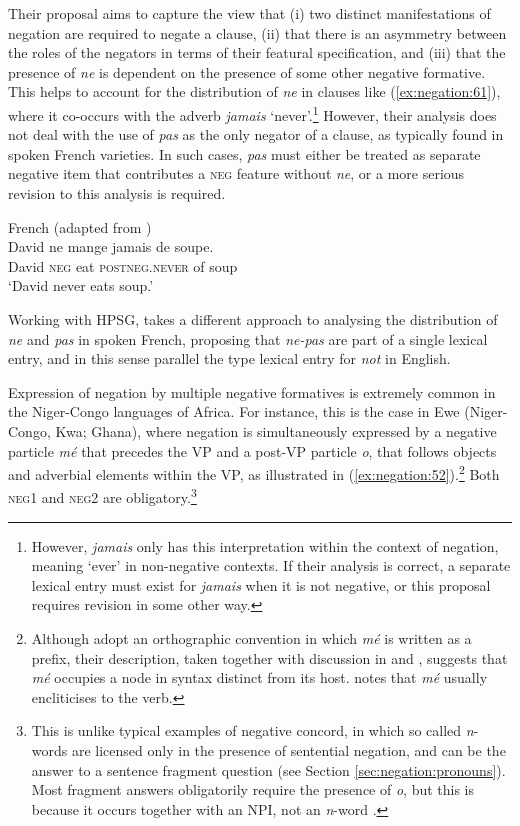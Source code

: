 \documentclass[output=paper,hidelinks]{langscibook}
\begin{document}
Their proposal aims to capture the view that (i) two distinct manifestations of negation are required to negate a clause, (ii) that there is an asymmetry between the roles of the negators in terms of their featural specification, and (iii) that the presence of \emph{ne} is dependent on the presence of some other negative formative. This helps to account for the distribution of \emph{ne} in clauses like (\ref{ex:negation:61}), where it co-occurs with the adverb \emph{jamais} ‘never’.\footnote{However, \emph{jamais} only has this interpretation within the context of negation, meaning `ever' in non-negative contexts. If their analysis is correct,  a separate lexical entry must exist for \emph{jamais} when it is not negative, or this proposal requires revision in some other way.} However, their analysis does not deal with the use of \emph{pas} as the only negator of a clause, as typically found in spoken French varieties. In such cases, \emph{pas} must either be treated as separate negative item that contributes a \textsc{neg} feature without \emph {ne}, or a more serious revision to this analysis is required.

\ea French (adapted from \citealt [143]{ButtEtAl1999})\\
\label{ex:negation:61} 
\gll David ne mange jamais de soupe.\\
David \textsc{neg} eat \textsc{postneg.never} of soup\\
\glt `David never eats soup.'
\z  

Working with HPSG, \citet{Kim:00,Kim:21} takes a different approach to analysing the distribution of \emph{ne} and \emph{pas} in spoken French, proposing that \emph{ne-pas} are part of a single lexical entry, and in this sense parallel the type lexical entry for \emph{not} in English.

Expression of negation by multiple negative formatives is extremely common in the Niger-Congo languages of Africa. For instance, this is the case in Ewe (Niger-Congo, Kwa; Ghana), where negation is simultaneously expressed by a negative particle \emph{mé} that precedes the VP and a post-VP particle \emph{o}, that follows objects and adverbial elements within the VP, as illustrated in (\ref{ex:negation:52}).\footnote{Although \citet {Collins:et:al:18} adopt an orthographic convention in which \emph{mé} is written as a prefix, their description, taken together with discussion in \citet[64--69]{Ameka:91} and \citet [64--69] {Aboh:10}, suggests that  \emph{mé} occupies a node in syntax distinct from its host. \citet [64--69] {Ameka:91} notes that \emph{mé} usually encliticises to the verb.} Both \textsc{neg1} and \textsc{neg2} are obligatory.\footnote{This is unlike typical examples of negative concord, in which so called \emph{n}-words are licensed only in the presence of sentential negation, and can be the answer to a sentence fragment question (see Section \ref{sec:negation:pronouns}). Most fragment answers obligatorily require the presence of \emph{o}, but this is because it occurs together with an NPI, not an \emph{n}-word \citep[350--354] {Collins:et:al:18}.}
\end{document}
